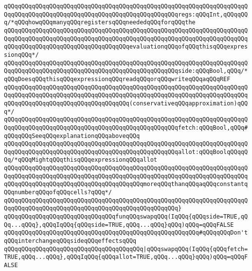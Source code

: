 \verb|qQQqqQQqqQQqqQQqqQQqqQQqqQQqqQQqqQQqqQQqqQQqqQQqqQQqqQQqqQQqqQQqqQQqqQQqqQQqqQQqqQQqqQQqqQQqqQQqqQQqqQQqqQQqqQQqqQQqqQQqregs:qQQqInt,qQQqqQQq/*qQQqhowqQQqmanyqQQqregistersqQQqneededqQQqforqQQqthe|\newline
\verb|qQQqqQQqqQQqqQQqqQQqqQQqqQQqqQQqqQQqqQQqqQQqqQQqqQQqqQQqqQQqqQQqqQQqqQQqqQQqqQQqqQQqqQQqqQQqqQQqqQQqqQQqqQQqqQQqqQQqqQQqqQQqqQQqqQQqqQQqqQQqqQQqqQQqqQQqqQQqqQQqqQQqqQQqqQQqqQQqevaluationqQQqofqQQqthisqQQqexpressionqQQq*/|\newline
\verb|qQQqqQQqqQQqqQQqqQQqqQQqqQQqqQQqqQQqqQQqqQQqqQQqqQQqqQQqqQQqqQQqqQQqqQQqqQQqqQQqqQQqqQQqqQQqqQQqqQQqqQQqqQQqqQQqqQQqqQQqside:qQQqBool,qQQq/*qQQqDoesqQQqthisqQQqexpressionqQQqreadqQQqorqQQqwriteqQQqaqQQqREF|\newline
\verb|qQQqqQQqqQQqqQQqqQQqqQQqqQQqqQQqqQQqqQQqqQQqqQQqqQQqqQQqqQQqqQQqqQQqqQQqqQQqqQQqqQQqqQQqqQQqqQQqqQQqqQQqqQQqqQQqqQQqqQQqqQQqqQQqqQQqqQQqqQQqqQQqqQQqqQQqqQQqqQQqqQQqqQQqqQQqqQQq(conservativeqQQqapproximation)qQQq*/|\newline
\verb|qQQqqQQqqQQqqQQqqQQqqQQqqQQqqQQqqQQqqQQqqQQqqQQqqQQqqQQqqQQqqQQqqQQqqQQqqQQqqQQqqQQqqQQqqQQqqQQqqQQqqQQqqQQqqQQqqQQqqQQqfetch:qQQqBool,qQQq#qQQqqQQqSeeqQQqexplanationqQQqaboveqQQq|\newline
\verb|qQQqqQQqqQQqqQQqqQQqqQQqqQQqqQQqqQQqqQQqqQQqqQQqqQQqqQQqqQQqqQQqqQQqqQQqqQQqqQQqqQQqqQQqqQQqqQQqqQQqqQQqqQQqqQQqqQQqqQQqallot:qQQqBoolqQQqqQQq/*qQQqMightqQQqthisqQQqexpressionqQQqallot|\newline
\verb|qQQqqQQqqQQqqQQqqQQqqQQqqQQqqQQqqQQqqQQqqQQqqQQqqQQqqQQqqQQqqQQqqQQqqQQqqQQqqQQqqQQqqQQqqQQqqQQqqQQqqQQqqQQqqQQqqQQqqQQqqQQqqQQqqQQqqQQqqQQqqQQqqQQqqQQqqQQqqQQqqQQqqQQqqQQqqQQqqQQqmoreqQQqthanqQQqaqQQqconstantqQQqnumberqQQqofqQQqcells?qQQq*/|\newline
\verb|qQQqqQQqqQQqqQQqqQQqqQQqqQQqqQQqqQQqqQQqqQQqqQQqqQQqqQQqqQQqqQQqqQQqqQQqqQQqqQQqqQQqqQQqqQQqqQQqqQQqqQQqqQQqqQQqqQQqqQQq}|\newline
\newline
\verb|qQQqqQQqqQQqqQQqqQQqqQQqqQQqqQQqfunqQQqswapqQQq(IqQQq{qQQqside=TRUE,qQQq...qQQq},qQQqIqQQq{qQQqside=TRUE,qQQq...qQQq}qQQq)qQQq=qQQqFALSE|\newline
\verb|qQQqqQQqqQQqqQQqqQQqqQQqqQQqqQQqqQQqqQQqqQQqqQQqqQQqqQQq#qQQqqQQqDon'tqQQqinterchangeqQQqsideqQQqeffectsqQQq|\newline
\verb|qQQqqQQqqQQqqQQqqQQqqQQqqQQqqQQqqQQqqQQq|\verb#|qQQqswapqQQq(IqQQq{qQQqfetch=TRUE,qQQq...qQQq},qQQqIqQQq{qQQqallot=TRUE,qQQq...qQQq}qQQq)qQQq=qQQqFALSE#\newline
